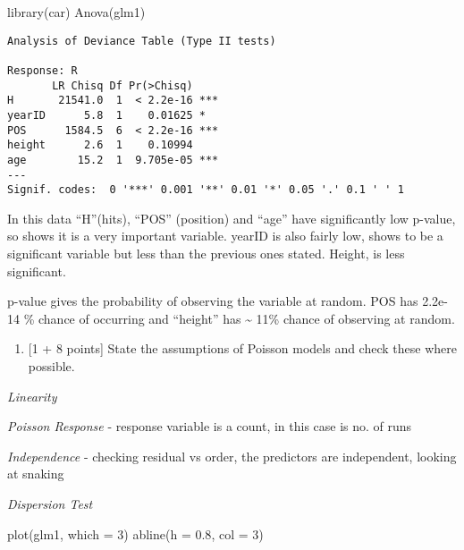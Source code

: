 \documentclass[
]{article}
\newenvironment{Shaded}{\begin{snugshade}}{\end{snugshade}}
\newcommand{\AttributeTok}[1]{\textcolor[rgb]{0.77,0.63,0.00}{#1}}
\newcommand{\DecValTok}[1]{\textcolor[rgb]{0.00,0.00,0.81}{#1}}
\newcommand{\FloatTok}[1]{\textcolor[rgb]{0.00,0.00,0.81}{#1}}
\newcommand{\FunctionTok}[1]{\textcolor[rgb]{0.00,0.00,0.00}{#1}}
\newcommand{\NormalTok}[1]{#1}
\providecommand{\tightlist}{%
  \setlength{\itemsep}{0pt}\setlength{\parskip}{0pt}}
\begin{document}
\begin{Shaded}
\begin{Highlighting}[]
\FunctionTok{library}\NormalTok{(car)}
\FunctionTok{Anova}\NormalTok{(glm1)}
\end{Highlighting}
\end{Shaded}

\begin{verbatim}
Analysis of Deviance Table (Type II tests)

Response: R
       LR Chisq Df Pr(>Chisq)    
H       21541.0  1  < 2.2e-16 ***
yearID      5.8  1    0.01625 *  
POS      1584.5  6  < 2.2e-16 ***
height      2.6  1    0.10994    
age        15.2  1  9.705e-05 ***
---
Signif. codes:  0 '***' 0.001 '**' 0.01 '*' 0.05 '.' 0.1 ' ' 1
\end{verbatim}

In this data ``H''(hits), ``POS'' (position) and ``age'' have
significantly low p-value, so shows it is a very important variable.
yearID is also fairly low, shows to be a significant variable but less
than the previous ones stated. Height, is less significant.

p-value gives the probability of observing the variable at random. POS
has 2.2e-14 \% chance of occurring and ``height'' has \textasciitilde{}
11\% chance of observing at random.

\begin{enumerate}
\def\labelenumi{\alph{enumi}.}
\setcounter{enumi}{3}
\tightlist
\item
  {[}1 + 8 points{]} State the assumptions of Poisson models and check
  these where possible.
\end{enumerate}

\emph{Linearity}

\emph{Poisson Response} - response variable is a count, in this case is
no. of runs

\emph{Independence} - checking residual vs order, the predictors are
independent, looking at snaking

\emph{Dispersion Test}

\begin{Shaded}
\begin{Highlighting}[]
\FunctionTok{plot}\NormalTok{(glm1, }\AttributeTok{which =} \DecValTok{3}\NormalTok{)}
\FunctionTok{abline}\NormalTok{(}\AttributeTok{h =} \FloatTok{0.8}\NormalTok{, }\AttributeTok{col =} \DecValTok{3}\NormalTok{)}
\end{Highlighting}
\end{Shaded}
\end{document}
